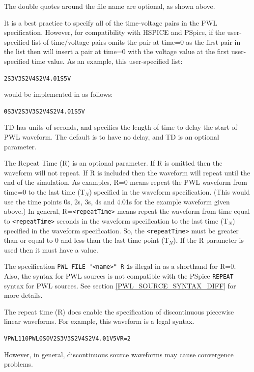 The double quotes around the file name are optional, as shown above.

It is a best practice to specify all of the time-voltage pairs in the PWL specification.
However, for compatibility with HSPICE and PSpice, if the user-specified list of 
time/voltage pairs omits the pair at time=0 as the first pair in the list then \Xyce{} 
will insert a pair at time=0 with the voltage value at the first user-specified time value.  
As an example, this user-specified list:
\begin{alltt}
2S 3V  3S 2V  4S 2V  4.01S 5V
\end{alltt}
would be implemented in \Xyce{} as follows:  
\begin{alltt} 
0S 3V  2S 3V  3S 2V  4S 2V  4.01S 5V
\end{alltt}

TD has units of seconds, and specifies the length of time to delay
the start of PWL waveform.  The default is to have no delay, and TD is 
an optional parameter.

The Repeat Time (R) is an optional parameter.  If R is omitted then the waveform
will not repeat.  If R is included then the waveform will repeat until the end
of the simulation.  As examples, R=0 means repeat the PWL waveform from time=0
to the last time (T$_N$) specified in the waveform specification. (This would use the
time points 0s, 2s, 3s, 4s and 4.01s for the example waveform given above.)
In general, R=\texttt{<repeatTime>} means repeat the waveform from time equal to
\texttt{<repeatTime>} seconds in the waveform specification to the last time (T$_N$)
specified in the waveform specification.  So, the \texttt{<repeatTime>} must be 
greater than or equal to 0 and less than the last time point (T$_N$).
If the R parameter is used then it must have a value.  

The specification \texttt {PWL  FILE "<name>"  R}  \texttt is illegal in \Xyce{} as
a shorthand for R=0.  Also, the \Xyce{} syntax for PWL sources is not compatible
with the PSpice \texttt{REPEAT} syntax for PWL sources. See section 
\ref{PWL_SOURCE_SYNTAX_DIFF} for more details.

The repeat time (R) does enable the specification of discontinuous piecewise linear
waveforms.  For example, this waveform is a legal \Xyce{} syntax.  
\begin{alltt}
VPWL1 1 0 PWL 0S 0V  2S 3V  3S 2V  4S 2V  4.01V 5V  R=2
\end{alltt}
However, in general, discontinuous source waveforms may cause convergence problems.

